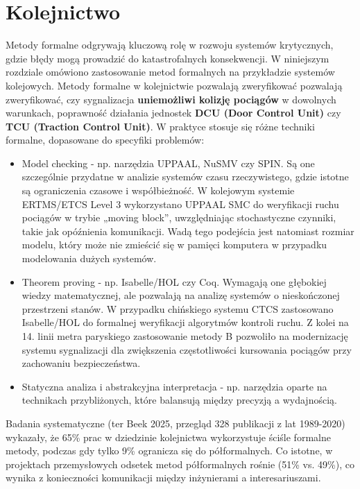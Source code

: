 \documentclass[conference]{IEEEtran}
\begin{document}
    \section{Kolejnictwo}
    Metody formalne odgrywają kluczową rolę w rozwoju systemów krytycznych, gdzie błędy mogą prowadzić do katastrofalnych konsekwencji.
    W niniejszym rozdziale omówiono zastosowanie metod formalnych na przykładzie systemów kolejowych. 
    Metody formalne w kolejnictwie pozwalają zweryfikować pozwalają zweryfikować, 
    czy sygnalizacja \textbf{uniemożliwi kolizję pociągów} w dowolnych warunkach, poprawność działania jednostek \textbf{DCU (Door Control Unit)} czy \textbf{TCU (Traction Control Unit)}.
    W praktyce stosuje się różne techniki formalne, dopasowane do specyfiki problemów:
    \begin{itemize}
        \item Model checking - np. narzędzia UPPAAL, NuSMV czy SPIN. Są one szczególnie przydatne w analizie systemów czasu rzeczywistego, gdzie istotne są ograniczenia czasowe i współbieżność. 
        W kolejowym systemie ERTMS/ETCS Level 3 wykorzystano UPPAAL SMC do weryfikacji ruchu pociągów w trybie „moving block”, uwzględniając stochastyczne czynniki, takie jak opóźnienia komunikacji. 
        Wadą tego podejścia jest natomiast rozmiar modelu, który może nie zmieścić się w pamięci komputera w przypadku modelowania dużych systemów.
        \item Theorem proving - np. Isabelle/HOL czy Coq. Wymagają one głębokiej wiedzy matematycznej, ale pozwalają na analizę systemów o nieskończonej przestrzeni stanów. W przypadku chińskiego systemu CTCS zastosowano Isabelle/HOL do formalnej weryfikacji algorytmów kontroli ruchu. Z kolei na 14. linii metra paryskiego zastosowanie metody B pozwoliło na modernizację systemu sygnalizacji dla zwiększenia częstotliwości kursowania pociągów przy zachowaniu bezpieczeństwa.
        \item Statyczna analiza i abstrakcyjna interpretacja - np. narzędzia oparte na technikach przybliżonych, które balansują między precyzją a wydajnością.
    \end{itemize}
    Badania systematyczne (ter Beek 2025, przegląd 328 publikacji z lat 1989-2020) wykazały, że 65\% prac w dziedzinie kolejnictwa wykorzystuje ściśle formalne metody, podczas gdy tylko 9\% ogranicza się do półformalnych. Co istotne, w projektach przemysłowych odsetek metod półformalnych rośnie (51\% vs. 49\%), co wynika z konieczności komunikacji między inżynierami a interesariuszami.
\end{document}
